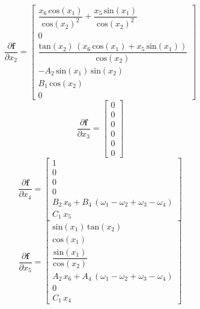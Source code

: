 \begin{equation}
	\dfrac{\partial \boldsymbol{ f}}{\partial  x_2} = 
	\begin{bmatrix}
	\dfrac{x_6 \,\mathrm{cos}\left(x_1 \right)}{{\mathrm{cos}\left(x_2 \right)}^2 }+\dfrac{x_5 \,\mathrm{sin}\left(x_1 \right)}{{\mathrm{cos}\left(x_2 \right)}^2 }\\
	0\\[0.5em]
	\dfrac{\mathrm{tan}\left(x_2 \right)\,{\left(x_6 \,\mathrm{cos}\left(x_1 \right)+x_5 \,\mathrm{sin}\left(x_1 \right)\right)}}{\mathrm{cos}\left(x_2 \right)}\\
	-A_2 \,\mathrm{sin}\left(x_1 \right)\,\mathrm{sin}\left(x_2 \right)\\
	B_1 \,\mathrm{cos}\left(x_2 \right)\\
	0
	\end{bmatrix}
\end{equation}
\begin{equation}
	\dfrac{\partial \boldsymbol{ f}}{\partial  x_3} = 
	\begin{bmatrix}
		0\\0\\0\\0\\0\\0
	\end{bmatrix}
\end{equation}
\begin{equation}
	\dfrac{\partial \boldsymbol{ f}}{\partial  x_4} = 
	\begin{bmatrix}
	1\\
	0\\
	0\\
	0\\
	B_2 \,x_6 +B_4 \,{\left(\omega_1 -\omega_2 +\omega_3 -\omega_4 \right)}\\
	C_1 \,x_5 
	\end{bmatrix}
\end{equation}
\begin{equation}
	\dfrac{\partial \boldsymbol{ f}}{\partial  x_5} = 
	\begin{bmatrix}
	\mathrm{sin}\left(x_1 \right)\,\mathrm{tan}\left(x_2 \right)\\
	\mathrm{cos}\left(x_1 \right)\\
	\dfrac{\mathrm{sin}\left(x_1 \right)}{\mathrm{cos}\left(x_2 \right)}\\
	A_2 \,x_6 +A_4 \,{\left(\omega_1 -\omega_2 +\omega_3 -\omega_4 \right)}\\
	0\\
	C_1 \,x_4 
	\end{bmatrix}
\end{equation}
